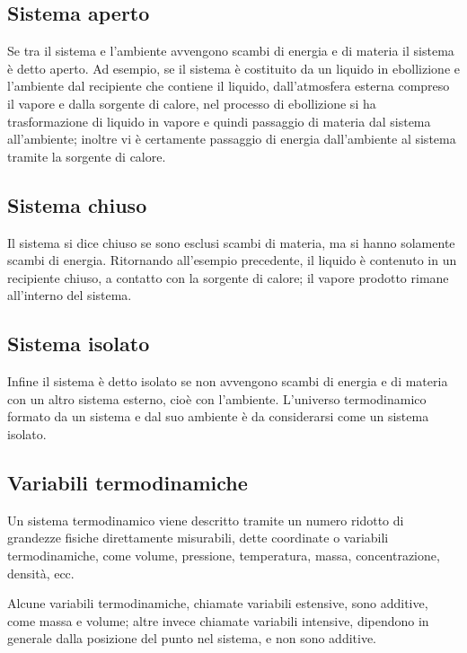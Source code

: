 \documentclass[class=book, crop=false, oneside, 12pt]{standalone}
\begin{document}
\subsection{Sistema aperto}

Se tra il sistema e l'ambiente avvengono scambi di energia e di materia il sistema è detto aperto. 
Ad esempio, se il sistema è costituito da un liquido in ebollizione e l'ambiente dal recipiente che contiene il liquido, dall'atmosfera esterna compreso il vapore e dalla sorgente di calore, nel processo di ebollizione si ha trasformazione di liquido in vapore e quindi passaggio di materia dal sistema all'ambiente; 
inoltre vi è certamente passaggio di energia dall'ambiente al sistema tramite la sorgente di calore.

\subsection{Sistema chiuso}

Il sistema si dice chiuso se sono esclusi scambi di materia, ma si hanno solamente scambi di energia. 
Ritornando all'esempio precedente, il liquido è contenuto in un recipiente chiuso, a contatto con la sorgente di calore; il vapore prodotto rimane all'interno del sistema. 

\subsection{Sistema isolato}

Infine il sistema è detto isolato se non avvengono scambi di energia e di materia con un altro sistema esterno, cioè con l'ambiente. 
L'universo termodinamico formato da un sistema e dal suo ambiente è da considerarsi come un sistema isolato. 

\subsection{Variabili termodinamiche}

Un sistema termodinamico viene descritto tramite un numero ridotto di grandezze fisiche direttamente misurabili, dette coordinate o variabili termodinamiche, come volume, pressione, temperatura, massa, concentrazione, densità, ecc. 

Alcune variabili termodinamiche, chiamate variabili estensive, sono additive, come massa e volume; altre invece chiamate variabili intensive, dipendono in generale dalla posizione del punto nel sistema, e non sono additive.
\end{document}
